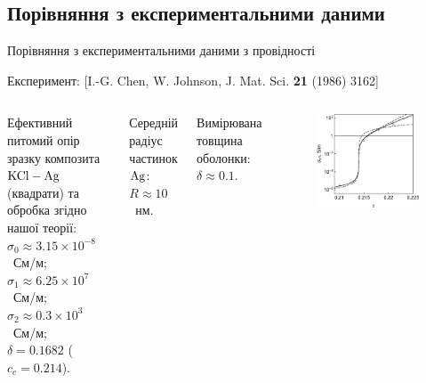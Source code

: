 \documentclass[10pt]{beamer}
\begin{document}
\subsection{Порівняння з експериментальними даними}
\begin{frame}{Порівняння з експериментальними даними з провідності}

    \scriptsize{Експеримент: [I.-G. Chen, W. Johnson, J. Mat. Sci. {\bf 21} (1986) 3162]}
    
\footnotesize
\begin{columns}[T,onlytextwidth]
    \vspace{10pt}
      Ефективний питомий опір зразку композита $\rm KCl-Ag$ (квадрати) та обробка згідно нашої теорії: \\
      $\sigma_0 \approx 3.15 \times 10^{-8}$~См/м; \\
      $\sigma_1 \approx 6.25 \times 10^7$~См/м; 
      $\sigma_2 \approx 0.3 \times 10^3$~См/м; \\
      $\delta = 0.1682$ ($c_c = 0.214$).

      \vspace{5pt}
      Середній радіус частинок $\rm Ag$: $R\approx 10$~нм. 
      
      Вимірювана товщина оболонки: $\delta \approx 0.1$.

      \begin{figure}
        \centering
        \includegraphics[width=0.99\textwidth]{images/chen-grannan-s2-lin.eps}
      \end{figure}
\end{columns}

\end{frame}
\end{document}
